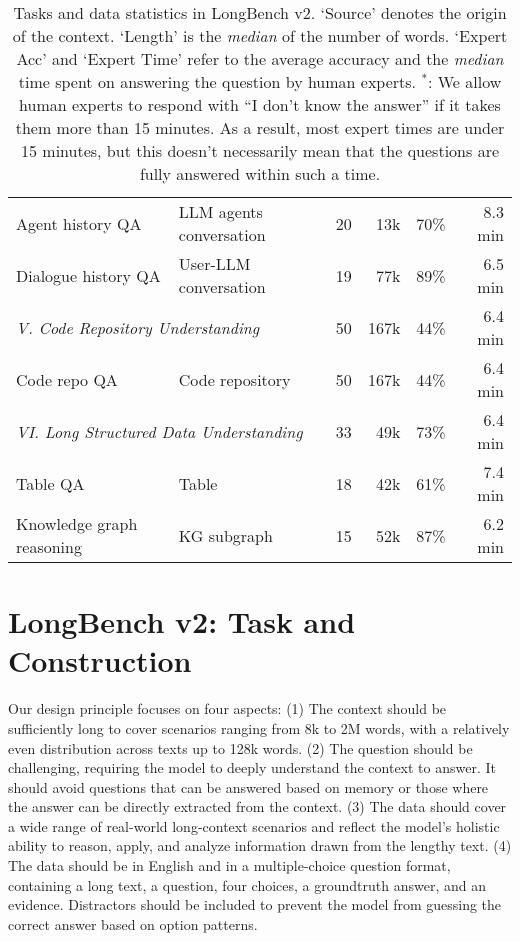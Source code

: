 \begin{table*}[t]
{\begin{tabular}{llrrrr}
Agent history QA & LLM agents conversation & 20 & 13k & 70\% & 8.3 min \\
Dialogue history QA & User-LLM conversation & 19 & 77k & 89\% & 6.5 min \\
\midrule
\multicolumn{2}{l}{\cellcolor{mypink}\emph{V. Code Repository Understanding}} & \cellcolor{mypink}50 & \cellcolor{mypink}167k & \cellcolor{mypink}44\% & \cellcolor{mypink}6.4 min \\
Code repo QA & Code repository & 50 & 167k & 44\% & 6.4 min \\
\midrule
\multicolumn{2}{l}{\cellcolor{mypink}\emph{VI. Long Structured Data Understanding}} & \cellcolor{mypink}33 & \cellcolor{mypink}49k & \cellcolor{mypink}73\% & \cellcolor{mypink}6.4 min \\
Table QA & Table & 18 & 42k & 61\% & 7.4 min \\
Knowledge graph reasoning & KG subgraph & 15 & 52k & 87\% & 6.2 min \\
\bottomrule
\end{tabular}
}
\caption{Tasks and data statistics in LongBench v2. `Source' denotes the origin of the context. `Length' is the \emph{median} of the number of words. `Expert Acc' and `Expert Time' refer to the average accuracy and the \emph{median} time spent on answering the question by human experts. 
$^*$: We allow human experts to respond with ``I don't know the answer'' if it takes them more than 15 minutes.
As a result, most expert times are under 15 minutes, but this doesn't necessarily mean that the questions are fully answered within such a time.}
\label{tb:stat}
\end{table*}

\section{LongBench v2: Task and Construction}

Our design principle focuses on four aspects: (1) The context should be sufficiently long to cover scenarios ranging from 8k to 2M words, with a relatively even distribution across texts up to 128k words.
(2) The question should be challenging, requiring the model to deeply understand the context to answer. It should avoid questions that can be answered based on memory or those where the answer can be directly extracted from the context.
(3) The data should cover a wide range of real-world long-context scenarios and reflect the model's holistic ability to reason, apply, and analyze information drawn from the lengthy text.
(4) The data should be in English and in a multiple-choice question format, containing a long text, a question, four choices, a groundtruth answer, and an evidence. Distractors should be included to prevent the model from guessing the correct answer based on option patterns.

